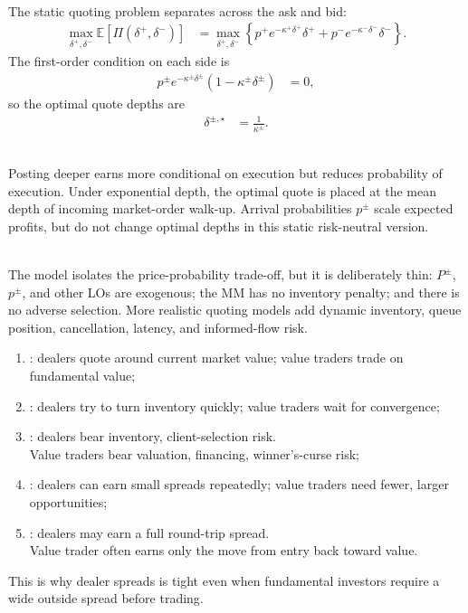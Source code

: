 \begin{model}
\par\smallskip\noindent{}\\
The static quoting problem separates across the ask and bid:
\begin{align*}
\max_{\delta^+,\delta^-}\mathbb{E}\left[\Pi(\delta^+,\delta^-)\right]
&=\max_{\delta^+,\delta^-}\left\{p^+e^{-\kappa^+\delta^+}\delta^+ + p^-e^{-\kappa^-\delta^-}\delta^-\right\}.
\end{align*}
The first-order condition on each side is
\begin{align*}
p^\pm e^{-\kappa^\pm\delta^\pm}(1-\kappa^\pm\delta^\pm)&=0,
\end{align*}
so the optimal quote depths are
\begin{align*}
\delta^{\pm,\star}&=\frac{1}{\kappa^\pm}.
\end{align*}

\par\smallskip\noindent{}\\
Posting deeper earns more conditional on execution but reduces probability of execution. Under exponential depth, the optimal quote is placed at the mean depth of incoming market-order walk-up. Arrival probabilities $p^\pm$ scale expected profits, but do not change optimal depths in this static risk-neutral version.

\par\smallskip\noindent{}\\
The model isolates the price-probability trade-off, but it is deliberately thin: $P^\pm$, $p^\pm$, and other LOs are exogenous; the MM has no inventory penalty; and there is no adverse selection. More realistic quoting models add dynamic inventory, queue position, cancellation, latency, and informed-flow risk.
\end{model}

\begin{taxonomy} 
\begin{enumerate}[label=\roman*.]
\setlength{\itemsep}{0pt}
\item {}: dealers quote around current market value; value traders trade on fundamental value;
\item {}: dealers try to turn inventory quickly; value traders wait for convergence;
\item {}: dealers bear inventory, client-selection risk.\\
Value traders bear valuation, financing, winner's-curse risk;
\item {}: dealers can earn small spreads repeatedly; value traders need fewer, larger opportunities;
\item {}: dealers may earn a full round-trip spread.\\
Value trader often earns only the move from entry back toward value.
\end{enumerate}
This is why dealer spreads is tight even when fundamental investors require a wide outside spread before trading.
\end{taxonomy}

